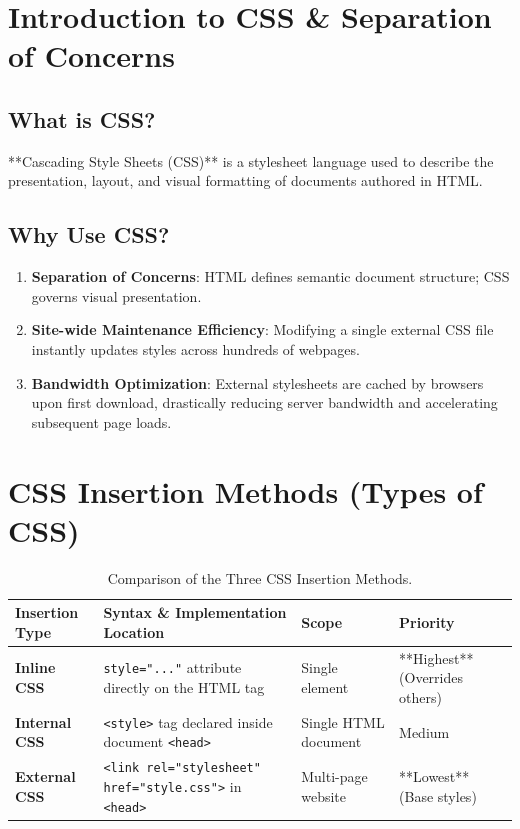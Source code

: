 \section{Introduction to CSS \& Separation of Concerns}

\subsection{What is CSS?}
**Cascading Style Sheets (CSS)** is a stylesheet language used to describe the presentation, layout, and visual formatting of documents authored in HTML.

\subsection{Why Use CSS?}
\begin{enumerate}[leftmargin=1.5em]
    \item \textbf{Separation of Concerns}: HTML defines semantic document structure; CSS governs visual presentation.
    \item \textbf{Site-wide Maintenance Efficiency}: Modifying a single external CSS file instantly updates styles across hundreds of webpages.
    \item \textbf{Bandwidth Optimization}: External stylesheets are cached by browsers upon first download, drastically reducing server bandwidth and accelerating subsequent page loads.
\end{enumerate}

\section{CSS Insertion Methods (Types of CSS)}

\begin{table}[htbp]
\centering
\small
\renewcommand{\arraystretch}{1.3}
\begin{tabularx}{\linewidth}{l>{\raggedright\arraybackslash}Xll}
\toprule
\textbf{Insertion Type} & \textbf{Syntax \& Implementation Location} & \textbf{Scope} & \textbf{Priority} \\
\midrule
\textbf{Inline CSS} & \texttt{style="..."} attribute directly on the HTML tag & Single element & **Highest** (Overrides others) \\
\textbf{Internal CSS} & \texttt{<style>} tag declared inside document \texttt{<head>} & Single HTML document & Medium \\
\textbf{External CSS} & \texttt{<link rel="stylesheet" href="style.css">} in \texttt{<head>} & Multi-page website & **Lowest** (Base styles) \\
\bottomrule
\end{tabularx}
\caption{Comparison of the Three CSS Insertion Methods.}
\label{tab:css-insertion}
\end{table}

